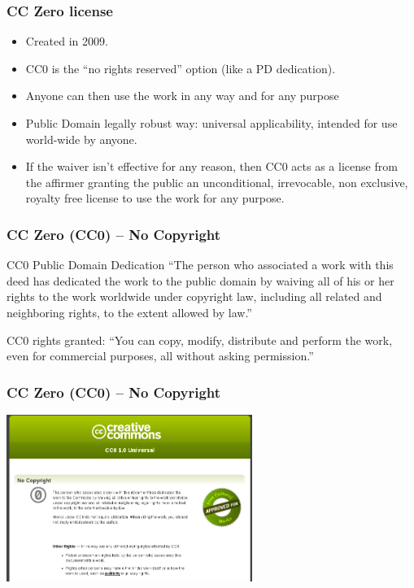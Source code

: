 
\begin{frame}
\frametitle{CC Zero license}


\begin{itemize}
\item Created in 2009.
\item CC0 is the ``no rights reserved'' option (like a PD dedication).
\item Anyone can then use the work in any way and for any purpose
\item Public Domain legally robust way: universal applicability, intended for use world-wide by anyone.
\item If the waiver isn't effective for any reason, then CC0 acts as a license from the affirmer granting the public an unconditional, irrevocable, non exclusive, royalty free license to use the work for any purpose. 
\end{itemize}


\end{frame}


\begin{frame}
\frametitle{CC Zero (CC0) -- No Copyright}

\begin{block}{CC0 Public Domain Dedication}
``The person who associated a work with this deed has dedicated the work to the public domain by waiving all of his or her rights to the work worldwide under copyright law, including all related and neighboring rights, to the extent allowed by law.''
\end{block}

\medskip

\small
CC0 rights granted: ``\alert{You can copy, modify, distribute and perform the work, even for commercial purposes, all without asking permission.}''

\end{frame}


\begin{frame}
\frametitle{CC Zero (CC0) -- No Copyright}

\begin{center}
\includegraphics[width=8cm]{figs/cc0.png}
\end{center}


\end{frame}

